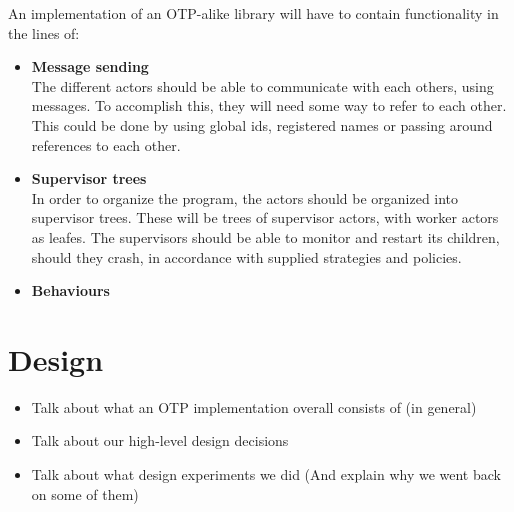\documentclass[a4paper]{article}
\begin{document}
An implementation of an OTP-alike library will have to contain functionality in the lines of:
\begin{itemize}
\item \textbf{Message sending}\\
  The different actors should be able to communicate with each others, using
  messages. To accomplish this, they will need some way to refer to each other.
  This could be done by using global ids, registered names or passing around
  references to each other.
\item \textbf{Supervisor trees}\\
  In order to organize the program, the actors should be organized into
  supervisor trees. These will be trees of supervisor actors, with worker actors
  as leafes. The supervisors should be able to monitor and restart its children,
  should they crash, in accordance with supplied strategies and policies.
\item \textbf{Behaviours}
\end{itemize}

\section{Design}
\begin{itemize}
\item Talk about what an OTP implementation overall consists of (in general)
\item Talk about our high-level design decisions
\item Talk about what design experiments we did (And explain why we went back on
  some of them)
\end{itemize}
\end{document}
